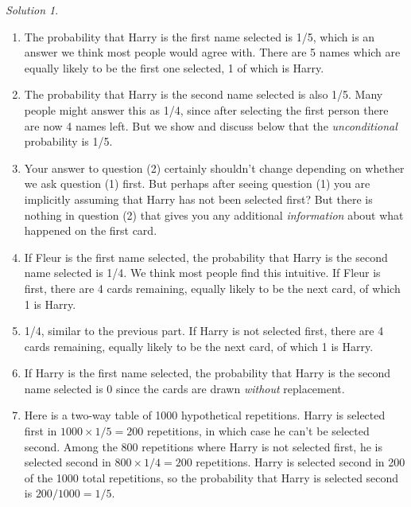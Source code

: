 \documentclass[
  letterpaper,
  DIV=11,
  numbers=noendperiod]{scrreprt}
\theoremstyle{plain}
\theoremstyle{definition}
\theoremstyle{definition}
\theoremstyle{definition}
\theoremstyle{remark}
\newtheorem{refsolution}{Solution}[chapter]
\begin{document}
\begin{tcolorbox}[enhanced jigsaw, opacityback=0, rightrule=.15mm, coltitle=black, colframe=quarto-callout-tip-color-frame, toprule=.15mm, colbacktitle=quarto-callout-tip-color!10!white, opacitybacktitle=0.6, left=2mm, toptitle=1mm, breakable, title={Solution (click to expand)}, bottomtitle=1mm, colback=white, leftrule=.75mm, titlerule=0mm, arc=.35mm, bottomrule=.15mm]

\begin{refsolution}
\leavevmode

\begin{enumerate}
\def\labelenumi{\arabic{enumi}.}
\item
  The probability that Harry is the first name selected is 1/5, which is
  an answer we think most people would agree with. There are 5 names
  which are equally likely to be the first one selected, 1 of which is
  Harry.
\item
  The probability that Harry is the second name selected is also 1/5.
  Many people might answer this as 1/4, since after selecting the first
  person there are now 4 names left. But we show and discuss below that
  the \emph{unconditional} probability is 1/5.
\item
  Your answer to question (2) certainly shouldn't change depending on
  whether we ask question (1) first. But perhaps after seeing question
  (1) you are implicitly assuming that Harry has not been selected
  first? But there is nothing in question (2) that gives you any
  additional \emph{information} about what happened on the first card.
\item
  If Fleur is the first name selected, the probability that Harry is the
  second name selected is 1/4. We think most people find this intuitive.
  If Fleur is first, there are 4 cards remaining, equally likely to be
  the next card, of which 1 is Harry.
\item
  1/4, similar to the previous part. If Harry is not selected first,
  there are 4 cards remaining, equally likely to be the next card, of
  which 1 is Harry.
\item
  If Harry is the first name selected, the probability that Harry is the
  second name selected is 0 since the cards are drawn \emph{without}
  replacement.
\item
  Here is a two-way table of 1000 hypothetical repetitions. Harry is
  selected first in \(1000\times 1/5 = 200\) repetitions, in which case
  he can't be selected second. Among the 800 repetitions where Harry is
  not selected first, he is selected second in \(800\times 1/4 = 200\)
  repetitions. Harry is selected second in 200 of the 1000 total
  repetitions, so the probability that Harry is selected second is
  \(200/1000 = 1/5\).


\end{enumerate}
\end{refsolution}
\end{tcolorbox}
\end{document}
